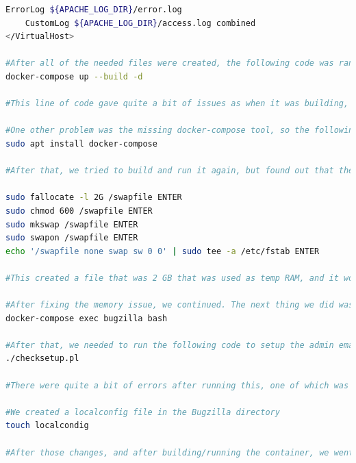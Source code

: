 \begin{lstlisting}[style=linuxstyle, language=bash]
    ErrorLog ${APACHE_LOG_DIR}/error.log
    CustomLog ${APACHE_LOG_DIR}/access.log combined
</VirtualHost>

#After all of the needed files were created, the following code was ran to build and run it:
docker-compose up --build -d

#This line of code gave quite a bit of issues as when it was building, there were a lot of packages missing which were needed to be added in the Dockerfile.

#One other problem was the missing docker-compose tool, so the following code was needed to install it:
sudo apt install docker-compose

#After that, we tried to build and run it again, but found out that the container that we were using didn't have a lot of memory and kept crashing after trying to build all of the packages. To fix this, a swap file was created  to act as temporary RAM. The following code was entered, line by line, hitting enter after each line of code (ENTER indicated a press of the return button).

sudo fallocate -l 2G /swapfile ENTER
sudo chmod 600 /swapfile ENTER
sudo mkswap /swapfile ENTER
sudo swapon /swapfile ENTER
echo '/swapfile none swap sw 0 0' | sudo tee -a /etc/fstab ENTER

#This created a file that was 2 GB that was used as temp RAM, and it would always be used after a container reset due to the echo line of code.

#After fixing the memory issue, we continued. The next thing we did was opening a command prompt inside of the Bugzilla container:
docker-compose exec bugzilla bash

#After that, we needed to run the following code to setup the admin email, name, and password to finally get the website up and running:
./checksetup.pl

#There were quite a bit of errors after running this, one of which was a file and directory name localconfig that messed up some things. In order to fix this, we edited the YAML file a bit and made sure that the localconfig volume wasn't created during build phase. The file codes pasted above are all up to date with all the new changes and additions. 

#We created a localconfig file in the Bugzilla directory
touch localcondig

#After those changes, and after building/running the container, we went into localconfig to change some things that the Bugzilla image required.


\end{lstlisting}
